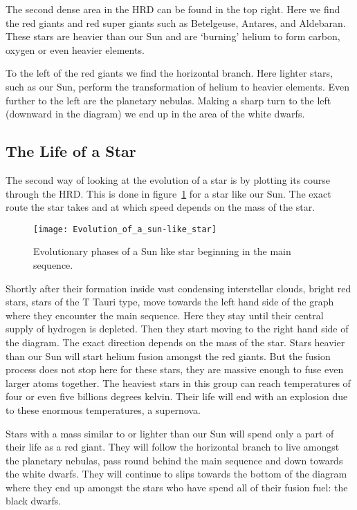 The second dense area in the HRD can be found in the top right. Here we find the red giants and red super giants such as Betelgeuse, Antares, and Aldebaran. These stars are heavier than our Sun and are `burning' helium to form carbon, oxygen or even heavier elements.

To the left of the red giants we find the horizontal branch. Here lighter stars, such as our Sun, perform the transformation of helium to heavier elements. Even further to the left are the planetary nebulas. Making a sharp turn to the left (downward in the diagram) we end up in the area of the white dwarfs.

\subsection{The Life of a Star}
The second way of looking at the evolution of a star is by plotting its course through the HRD. This is done in figure~\ref{fig:HRD_2} for a star like our Sun. The exact route the star takes and at which speed depends on the mass of the star.

\begin{figure}\begin{center}
\texttt{[image: Evolution\_of\_a\_sun-like\_star]}
\caption{Evolutionary phases of a Sun like star beginning in the main sequence.\protect\footnotemark}\label{fig:HRD_2}
\end{center}\end{figure}

Shortly after their formation inside vast condensing interstellar clouds, bright red stars, stars of the T Tauri type, move towards the left hand side of the graph where they encounter the main sequence. Here they stay until their central supply of hydrogen is depleted. Then they start moving to the right hand side of the diagram. The exact direction depends on the mass of the star. Stars heavier than our Sun will start helium fusion amongst the red giants. But the fusion process does not stop here for these stars, they are massive enough to fuse even larger atoms together. The heaviest stars in this group can reach temperatures of four or even five billions degrees kelvin. Their life will end with an explosion due to these enormous temperatures, a supernova. 

Stars with a mass similar to or lighter than our Sun will spend only a part of their life as a red giant. They will follow the horizontal branch to live amongst the planetary nebulas, pass round behind the main sequence and down towards the white dwarfs. They will continue to slips towards the bottom of the diagram where they end up amongst the stars who have spend all of their fusion fuel: the black dwarfs.

